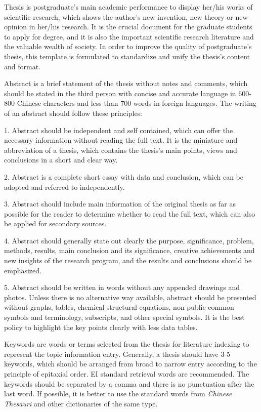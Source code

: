 \documentclass{cqupt_thesis}
\begin{document}
    \begin{enabstract}

        Thesis is postgraduate's main academic performance to display her/his works of scientific research, which shows the author's new invention, new theory or new opinion in her/his research. It is the crucial document for the graduate students to apply for degree, and it is also the important scientific research literature and the valuable wealth of society. In order to improve the quality of postgraduate's thesis, this template is formulated to standardize and unify the thesis's content and format.

        Abstract is a brief statement of the thesis without notes and comments, which should be stated in the third person with concise and accurate language in 600-800 Chinese characters and less than 700 words in foreign languages. The writing of an abstract should follow these principles:

        1. Abstract should be independent and self contained, which can offer the necessary information without reading the full text. It is the miniature and abbreviation of a thesis, which contains the thesis's main points, views and conclusions in a short and clear way.

        2. Abstract is a complete short essay with data and conclusion, which can be adopted and referred to independently.

        3. Abstract should include main information of the original thesis as far as possible for the reader to determine whether to read the full text, which can also be applied for secondary sources.

        4. Abstract should generally state out clearly the purpose, significance, problem, methods, results, main conclusion and its significance, creative achievements and new insights of the research program, and the results and conclusions should be emphasized.

        5. Abstract should be written in words without any appended drawings and photos. Unless there is no alternative way available, abstract should be presented without graphs, tables, chemical structural equations, non-public common symbols and terminology, subscripts, and other special symbols. It is the best policy to highlight the key points clearly with less data tables.

        Keywords are words or terms selected from the thesis for literature indexing to represent the topic information entry. Generally, a thesis should have 3-5 keywords, which should be arranged from broad to narrow entry according to the principle of epitaxial order. EI standard retrieval words are recommended. The keywords should be separated by a comma and there is no punctuation after the last word. If possible, it is better to use the standard words from \textit{Chinese Thesauri} and other dictionaries of the same type.


\end{enabstract}
\end{document}
